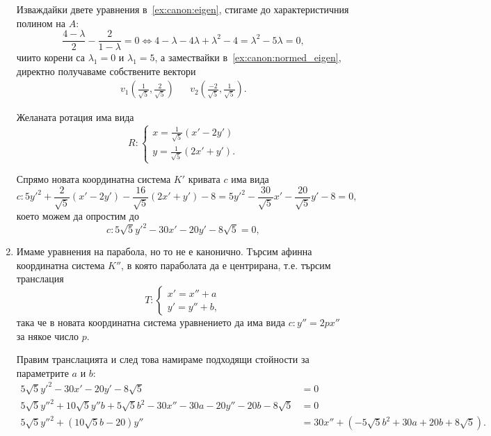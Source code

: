\documentclass[numbers=endperiod, DIV=15]{scrartcl}
\begin{document}
\begin{solution}
\begin{enumerate}
    Изваждайки двете уравнения в~\ref{ex:canon:eigen}, стигаме до характеристичния полином на $A$:
    \begin{displaymath}
      \frac {4 - \lambda} 2 - \frac 2 {1 - \lambda} = 0 \iff 4 - \lambda - 4\lambda + \lambda^2 - 4 = \lambda^2 - 5\lambda = 0,
    \end{displaymath}
    чиито корени са $\lambda_1 = 0$ и $\lambda_1 = 5$, а замествайки в~\ref{ex:canon:normed_eigen}, директно получаваме собствените вектори
    \begin{align*}
      v_1 \left(\frac 1 {\sqrt 5}, \frac 2 {\sqrt 5} \right)
      &&
      v_2 \left(\frac {-2} {\sqrt 5}, \frac 1 {\sqrt 5} \right).
    \end{align*}

    Желаната ротация има вида
    \begin{displaymath}
      R: \begin{cases}
        x = \frac 1 {\sqrt 5} (x' - 2y') \\
        y = \frac 1 {\sqrt 5} (2x' + y').
      \end{cases}
    \end{displaymath}

    Спрямо новата координатна система $K'$ кривата $c$ има вида
    \begin{displaymath}
      c: 5y'^2 + \frac 2 {\sqrt 5} (x' - 2y') - \frac {16} {\sqrt 5} (2x' + y') - 8 = 5y'^2 - \frac {30} {\sqrt 5} x' - \frac {20} {\sqrt 5} y' - 8 = 0,
    \end{displaymath}
    което можем да опростим до
    \begin{displaymath}
      c: 5 \sqrt 5 y'^2 - 30 x' - 20 y' - 8 \sqrt 5 = 0,
    \end{displaymath}

    \item Имаме уравнения на парабола, но то не е канонично. Търсим афинна координатна система $K''$, в която параболата да е центрирана, т.е. търсим транслация
    \begin{displaymath}
      T: \begin{cases}
        x' = x'' + a \\
        y' = y'' + b,
      \end{cases}
    \end{displaymath}
    така че в новата координатна система уравнението да има вида $c: y'' = 2px''$ за някое число $p$.

    Правим транслацията и след това намираме подходящи стойности за параметрите $a$ и $b$:
    \begin{align*}
      5 \sqrt 5 y'^2 - 30 x' - 20 y' - 8 \sqrt 5 &= 0 \\
      5 \sqrt 5 y''^2 + 10 \sqrt 5 y'' b + 5 \sqrt 5 b^2 - 30 x'' - 30a - 20 y'' - 20b - 8 \sqrt 5 &= 0 \\
      5 \sqrt 5 y''^2 + (10 \sqrt 5 b - 20) y'' &= 30 x'' + (- 5 \sqrt 5 b^2 + 30a + 20b + 8 \sqrt 5).
    \end{align*}


\end{enumerate}
\end{solution}
\end{document}
